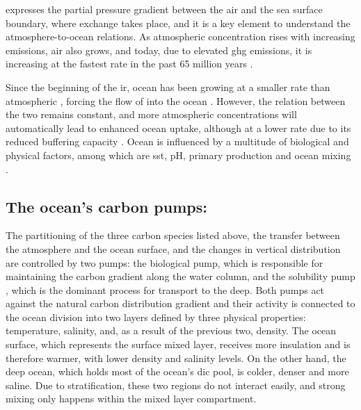  expresses the  partial pressure gradient between the air and the sea surface boundary, where  exchange takes place, and it is a key element to understand the atmosphere-to-ocean relations. As atmospheric  concentration rises with increasing emissions, air  also grows, and today, due to elevated \ac{ghg} emissions, it is increasing at the fastest rate in the past 65 million years \citep{watson2017quantifying}. 

Since the beginning of the \ac{ir}, ocean  has been growing at a smaller rate than atmospheric , forcing the flow of  into the ocean \citep{lenton2012observed}. However, the relation between the two remains constant, and more atmospheric  concentrations will automatically lead to enhanced ocean uptake, although at a lower rate due to its reduced buffering capacity \citep{chikamoto2023long}. Ocean  is influenced by a multitude of biological and physical factors, among which are \ac{sst}, pH, primary production and ocean mixing \citep{fassbender2022quantifying, kheshgi1995sequestering}. 

\subsection{The ocean's carbon pumps:}

The partitioning of the three carbon species listed above, the  transfer between the atmosphere and the ocean surface, and the changes in vertical distribution are controlled by two pumps: the biological pump, which is responsible for maintaining the carbon gradient along the water column, and the solubility pump \citep{heinze2015ocean}, which is the dominant process for  transport to the deep. Both pumps act against the natural carbon distribution gradient and their activity is connected to the ocean division into two layers defined by three physical properties: temperature, salinity, and, as a result of the previous two, density. The ocean surface, which represents the surface mixed layer, receives more insulation and is therefore warmer, with lower density and salinity levels. On the other hand, the deep ocean, which holds most of the ocean's \ac{dic} pool, is colder, denser and more saline. Due to stratification, these two regions do not interact easily, and strong mixing only happens within the mixed layer compartment. 

